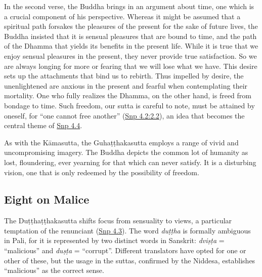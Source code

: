 \documentclass[12pt,openany]{book}%
\begin{document}
In the second verse, the Buddha brings in an argument about time, one which is a crucial component of his perspective. Whereas it might be assumed that a spiritual path forsakes the pleasures of the present for the sake of future lives, the Buddha insisted that it is sensual pleasures that are bound to time, and the path of the Dhamma that yields its benefits in the present life. While it is true that we enjoy sensual pleasures in the present, they never provide true satisfaction. So we are always longing for more or fearing that we will lose what we have. This desire sets up the attachments that bind us to rebirth. Thus impelled by desire, the unenlightened are anxious in the present and fearful when contemplating their mortality. One who fully realizes the Dhamma, on the other hand, is freed from bondage to time. Such freedom, our sutta is careful to note, must be attained by oneself, for “one cannot free another” (\href{https://suttacentral.net/snp4.2/en/sujato\#2.2}{Snp 4.2:2.2}), an idea that becomes the central theme of \href{https://suttacentral.net/snp4.4/en/sujato}{Snp 4.4}.

As with the \textsanskrit{Kāmasutta}, the \textsanskrit{Guhaṭṭhakasutta} employs a range of vivid and uncompromising imagery. The Buddha depicts the common lot of humanity as lost, floundering, ever yearning for that which can never satisfy. It is a disturbing vision, one that is only redeemed by the possibility of freedom.

\subsection*{Eight on Malice}

The \textsanskrit{Duṭṭhaṭṭhakasutta} shifts focus from sensuality to views, a particular temptation of the renunciant (\href{https://suttacentral.net/snp4.3/en/sujato}{Snp 4.3}). The word \textit{\textsanskrit{duṭṭha}} is formally ambiguous in Pali, for it is represented by two distinct words in Sanskrit: \textit{\textsanskrit{dviṣṭa}} = “malicious” and \textit{\textsanskrit{duṣṭa}} = “corrupt”. Different translators have opted for one or other of these, but the usage in the suttas, confirmed by the Niddesa, establishes “malicious” as the correct sense.
\end{document}
